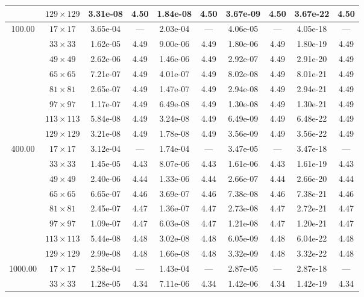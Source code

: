 \documentclass[preprint, 12pt]{elsarticle}
\begin{document}
\begin{center}
\begin{table}[H]
{\begin{tabular*}{\textwidth}{@{\extracolsep\fill}cccccccccc@{}}
    & $129\times 129$ & 3.31e-08 & 4.50 & 1.84e-08 & 4.50 & 3.67e-09 & 4.50 & 3.67e-22 & 4.50 \\
    \hline\hline
    \multirow{7}{*}{100.00} & $17\times 17$ & 3.65e-04 & --- & 2.03e-04 & --- & 4.06e-05 & --- & 4.05e-18 & --- \\
    & $33\times 33$ & 1.62e-05 & 4.49 & 9.00e-06 & 4.49 & 1.80e-06 & 4.49 & 1.80e-19 & 4.49 \\
    & $49\times 49$ & 2.62e-06 & 4.49 & 1.46e-06 & 4.49 & 2.92e-07 & 4.49 & 2.91e-20 & 4.49 \\
    & $65\times 65$ & 7.21e-07 & 4.49 & 4.01e-07 & 4.49 & 8.02e-08 & 4.49 & 8.01e-21 & 4.49 \\
    & $81\times 81$ & 2.65e-07 & 4.49 & 1.47e-07 & 4.49 & 2.94e-08 & 4.49 & 2.94e-21 & 4.49 \\
    & $97\times 97$ & 1.17e-07 & 4.49 & 6.49e-08 & 4.49 & 1.30e-08 & 4.49 & 1.30e-21 & 4.49 \\
    & $113\times 113$ & 5.84e-08 & 4.49 & 3.24e-08 & 4.49 & 6.49e-09 & 4.49 & 6.48e-22 & 4.49 \\
    & $129\times 129$ & 3.21e-08 & 4.49 & 1.78e-08 & 4.49 & 3.56e-09 & 4.49 & 3.56e-22 & 4.49 \\
    \hline\hline
    \multirow{7}{*}{400.00} & $17\times 17$ & 3.12e-04 & --- & 1.74e-04 & --- & 3.47e-05 & --- & 3.47e-18 & --- \\
    & $33\times 33$ & 1.45e-05 & 4.43 & 8.07e-06 & 4.43 & 1.61e-06 & 4.43 & 1.61e-19 & 4.43 \\
    & $49\times 49$ & 2.40e-06 & 4.44 & 1.33e-06 & 4.44 & 2.66e-07 & 4.44 & 2.66e-20 & 4.44 \\
    & $65\times 65$ & 6.65e-07 & 4.46 & 3.69e-07 & 4.46 & 7.38e-08 & 4.46 & 7.38e-21 & 4.46 \\
    & $81\times 81$ & 2.45e-07 & 4.47 & 1.36e-07 & 4.47 & 2.73e-08 & 4.47 & 2.72e-21 & 4.47 \\
    & $97\times 97$ & 1.09e-07 & 4.47 & 6.03e-08 & 4.47 & 1.21e-08 & 4.47 & 1.20e-21 & 4.47 \\
    & $113\times 113$ & 5.44e-08 & 4.48 & 3.02e-08 & 4.48 & 6.05e-09 & 4.48 & 6.04e-22 & 4.48 \\
    & $129\times 129$ & 2.99e-08 & 4.48 & 1.66e-08 & 4.48 & 3.32e-09 & 4.48 & 3.32e-22 & 4.48 \\
    \hline\hline
    \multirow{7}{*}{1000.00} & $17\times 17$ & 2.58e-04 & --- & 1.43e-04 & --- & 2.87e-05 & --- & 2.87e-18 & --- \\
    & $33\times 33$ & 1.28e-05 & 4.34 & 7.11e-06 & 4.34 & 1.42e-06 & 4.34 & 1.42e-19 & 4.34 \\

\end{tabular*}}
\end{table}
\end{center}
\end{document}
